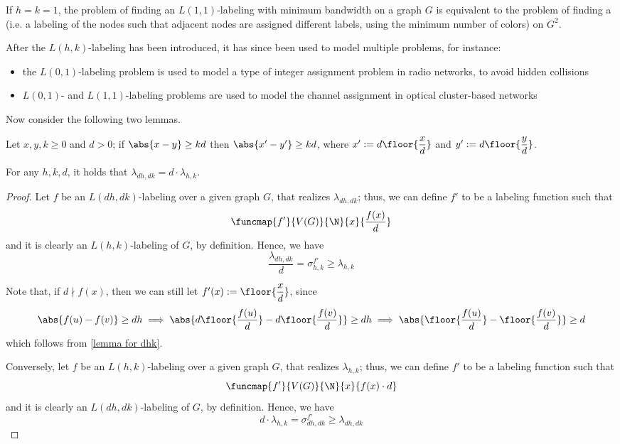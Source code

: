 \documentclass[a4paper, 12pt]{report}
\begin{document}
    If $h = k = 1$, the problem of finding an $L(1, 1)$-labeling with minimum bandwidth on a graph $G$ is equivalent to the problem of finding a  (i.e. a labeling of the nodes such that adjacent nodes are assigned different labels, using the minimum number of colors) on $G^2$.

    After the $L(h, k)$-labeling has been introduced, it has since been used to model multiple problems, for instance:

    \begin{itemize}
        \item the $L(0, 1)$-labeling problem is used to model a type of integer  assignment problem in radio networks, to avoid hidden collisions
        \item $L(0, 1)$- and $L(1,1)$-labeling problems are used to model the channel assignment in optical cluster-based networks
    \end{itemize}

    Now consider the following two lemmas.

    \begin{framedlem}[label={lemma for dhk}]{}
        Let $x, y, k \ge 0$ and $d > 0$; if $\abs{ x- y} \ge kd$ then $\abs{x' - y'} \ge kd$, where $x' := d \floor{\dfrac{x}{d}}$ and $y' := d \floor{\dfrac{y}{d}}$.
    \end{framedlem}

    \begin{framedlem}{}
        For any $h, k, d$, it holds that $\lambda_{dh, dk} = d \cdot \lambda_{h, k}$.
    \end{framedlem}

    \begin{proof}
        Let $f$ be an $L(dh, dk)$-labeling over a given graph $G$, that realizes $\lambda_{dh, dk}$; thus, we can define $f'$ to be a labeling function such that $$\funcmap{f'}{V(G)}{\N}{x}{\dfrac{f(x)}{d}}$$ and it is clearly an $L(h, k)$-labeling of $G$, by definition. Hence, we have $$\dfrac{\lambda_{dh, dk}}{d} = \sigma_{h, k}^{f'} \ge \lambda_{h, k}$$

        Note that, if $d \nmid f(x)$, then we can still let $f'(x) := \floor{\dfrac{x}{d}}$, since $$\abs{f(u) - f(v)} \ge dh \implies \abs{d \floor{\dfrac{f(u)}{d}} -  d \floor{\dfrac{f(v)}{d}}} \ge dh \implies \abs{\floor{\dfrac{f(u)}{d}} - \floor{\dfrac{f(v)}{d}}} \ge d$$ which follows from \cref{lemma for dhk}.

        Conversely, let $f$ be an $L(h, k)$-labeling over a given graph $G$, that realizes $\lambda_{h, k}$; thus, we can define $f'$ to be a labeling function such that $$\funcmap{f'}{V(G)}{\N}{x}{f(x) \cdot d}$$ and it is clearly an $L(dh, dk)$-labeling of $G$, by definition. Hence, we have $$d \cdot \lambda_{h,k} = \sigma_{dh, dk}^{f'} \ge \lambda_{dh, dk}$$
    \end{proof}
\end{document}
